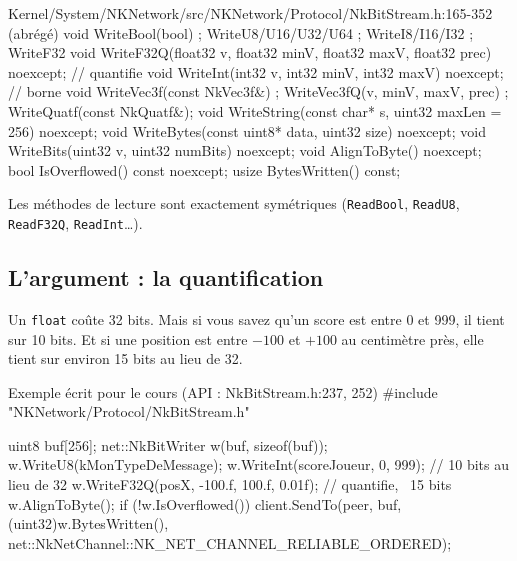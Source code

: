 \begin{nkcode}{Kernel/System/NKNetwork/src/NKNetwork/Protocol/NkBitStream.h:165-352 (abrégé)}
void WriteBool(bool) ;  WriteU8/U16/U32/U64 ;  WriteI8/I16/I32 ;  WriteF32
void WriteF32Q(float32 v, float32 minV, float32 maxV, float32 prec) noexcept;    // quantifie
void WriteInt(int32 v, int32 minV, int32 maxV) noexcept;                         // borne
void WriteVec3f(const NkVec3f&) ;  WriteVec3fQ(v, minV, maxV, prec) ;  WriteQuatf(const NkQuatf&);
void WriteString(const char* s, uint32 maxLen = 256) noexcept;
void WriteBytes(const uint8* data, uint32 size) noexcept;
void WriteBits(uint32 v, uint32 numBits) noexcept;
void AlignToByte() noexcept;
bool IsOverflowed() const noexcept;
usize BytesWritten() const;
\end{nkcode}

Les méthodes de lecture sont exactement symétriques (\texttt{ReadBool},
\texttt{ReadU8}, \texttt{ReadF32Q}, \texttt{ReadInt}\dots).

\subsection{L'argument : la quantification}

Un \texttt{float} coûte 32 bits. Mais si vous savez qu'un score est entre 0 et
999, il tient sur 10 bits. Et si une position est entre $-100$ et $+100$ au
centimètre près, elle tient sur environ 15 bits au lieu de 32.

\begin{nkcode}{Exemple écrit pour le cours (API : NkBitStream.h:237, 252)}
#include "NKNetwork/Protocol/NkBitStream.h"

uint8 buf[256];
net::NkBitWriter w(buf, sizeof(buf));
w.WriteU8(kMonTypeDeMessage);
w.WriteInt(scoreJoueur, 0, 999);              // 10 bits au lieu de 32
w.WriteF32Q(posX, -100.f, 100.f, 0.01f);      // quantifie, ~15 bits
w.AlignToByte();
if (!w.IsOverflowed())
    client.SendTo(peer, buf, (uint32)w.BytesWritten(),
                  net::NkNetChannel::NK_NET_CHANNEL_RELIABLE_ORDERED);
\end{nkcode}

